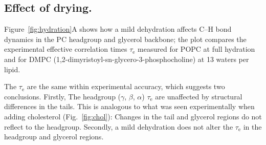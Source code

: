 \documentclass[journal=jpcbfk,manuscript=article,layout=twocolumn]{achemso}
\begin{document}
\subsection*{Effect of drying.}
Figure~\ref{fig:hydration}A shows how a mild dehydration affects
C--H bond dynamics in the PC headgroup and glycerol backbone;
the plot compares the experimental effective correlation times $\tau_\mathrm e$
measured for POPC at full hydration and for DMPC (1,2-dimyristoyl-sn-glycero-3-phosphocholine)
at 13 waters per lipid.


The $\tau_\mathrm e$ are the same within experimental accuracy, which suggests two conclusions. Firstly, 
The headgroup ($\gamma$, $\beta$, $\alpha$) $\tau_\mathrm e$ are unaffected by structural differences in the tails. This is analogous to  what was seen experimentally when adding cholesterol
(Fig.~\ref{fig:chol}): Changes in the tail and glycerol regions do not reflect to the headgroup. Secondly, a mild dehydration does not alter the $\tau_\mathrm e$
in the headgroup and glycerol regions. 
\end{document}
